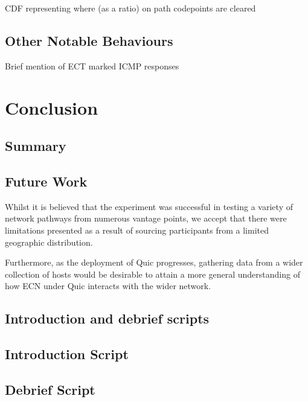 \documentclass{l4proj}
\begin{document}
CDF representing where (as a ratio) on path codepoints are cleared


\section{Other Notable Behaviours}

{{Brief mention of ECT marked ICMP responses}}



\chapter{Conclusion}    
\section{Summary}


\section{Future Work}

Whilst it is believed that the experiment was successful in testing a variety of network pathways from numerous vantage points, we accept that there were limitations presented as a result of sourcing participants from a limited geographic distribution.

Furthermore, as the deployment of Quic progresses, gathering data from a wider collection of hosts would be desirable to attain a more general understanding of how ECN under Quic interacts with the wider network.


%
% 

\begin{appendices}

\chapter{Introduction and debrief scripts}

\section{Introduction Script}
\section{Debrief Script}

\end{appendices}






\end{document}
